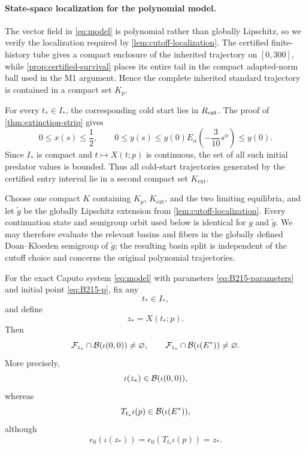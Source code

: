\paragraph{State-space localization for the polynomial model.}
The vector field in \eqref{eq:model} is polynomial rather than globally Lipschitz, so we verify the localization required by \cref{lem:cutoff-localization}.  The certified finite-history tube gives a compact enclosure of the inherited trajectory on \([0,300]\), while \cref{prop:certified-survival} places its entire tail in the compact adapted-norm ball used in the M1 argument.  Hence the complete inherited standard trajectory is contained in a compact set \(K_p\).

For every \(t_*\in I_*\), the corresponding cold start lies in \(R_{\mathrm{ext}}\).  The proof of \cref{thm:extinction-strip} gives
\[
  0\le x(s)\le\frac12,
  \qquad
  0\le y(s)\le y(0)E_\alpha\!\left(-\frac3{10}s^\alpha\right)
  \le y(0).
\]
Since \(I_*\) is compact and \(t\mapsto X(t;p)\) is continuous, the set of all such initial predator values is bounded.  Thus all cold-start trajectories generated by the certified entry interval lie in a second compact set \(K_{\mathrm{ext}}\).

Choose one compact \(K\) containing \(K_p\), \(K_{\mathrm{ext}}\), and the two limiting equilibria, and let \(\widetilde g\) be the globally Lipschitz extension from \cref{lem:cutoff-localization}.  Every continuation state and semigroup orbit used below is identical for \(g\) and \(\widetilde g\).  We may therefore evaluate the relevant basins and fibers in the globally defined Doan--Kloeden semigroup of \(\widetilde g\); the resulting basin split is independent of the cutoff choice and concerns the original polynomial trajectories.

\begin{theorem}
\label{thm:principal}
For the exact Caputo system \eqref{eq:model} with parameters \eqref{eq:B215-parameters} and initial point \eqref{eq:B215-p}, fix any
\[
  t_*\in I_*,
\]
and define
\[
  z_*=X(t_*;p).
\]
Then
\begin{equation}
  \mathcal{F}_{z_*}\cap\mathcal{B}(\iota(0,0))
  \neq\varnothing,
  \qquad
  \mathcal{F}_{z_*}\cap\mathcal{B}(\iota(E^{*}))
  \neq\varnothing.
  \label{eq:multibasin-conclusion}
\end{equation}
More precisely,
\[
  \iota(z_*)\in\mathcal{B}(\iota(0,0)),
\]
whereas
\[
  T_{t_*}\iota(p)\in\mathcal{B}(\iota(E^{*})),
\]
although
\begin{equation}
  e_0(\iota(z_*))
  =
  e_0(T_{t_*}\iota(p))
  =
  z_*.
  \label{eq:same-present}
\end{equation}
\end{theorem}

